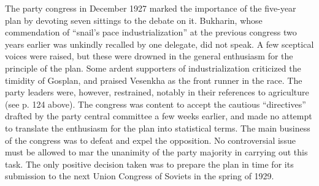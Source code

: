 The party congress in December 1927 marked the importance of the five-year plan by devoting seven sittings to the debate on it. Bukharin, whose commendation of ``snail's pace industrialization'' at the previous congress two years earlier was unkindly recalled by one delegate, did not speak. A few sceptical voices were raised, but these were drowned in the general enthusiasm for the principle of the plan. Some ardent supporters of industrialization criticized the timidity of Gosplan, and praised Vesenkha as the front runner in the race. The party leaders were, however, restrained, notably in their references to agriculture (see p. 124 above). The congress was content to accept the cautious ``directives'' drafted by the party central committee a few weeks earlier, and made no attempt to translate the enthusiasm for the plan into statistical terms. The main business of the congress was to defeat and expel the opposition. No controversial issue must be allowed to mar the unanimity of the party majority in carrying out this task. The only positive decision taken was to prepare the plan in time for its submission to the next Union Congress of Soviets in the spring of 1929. 

